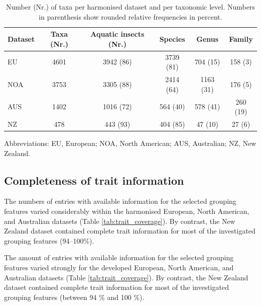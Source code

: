 \documentclass{article}
\begin{document}
\begin{table}[ht]
    \centering
    \caption{Number (Nr.) of taxa per harmonised dataset and per taxonomic level. Numbers in parenthesis show rounded relative frequencies in percent.} 
    \label{tab:tax_coverage}
    \begin{tabular}{lccccc}
    \toprule[.1em]
    Dataset & Taxa (Nr.) & Aquatic insects (Nr.) & Species & Genus & Family \\ 
    \toprule[.1em]
    EU & 4601 & 3942 (86) & 3739 (81) & 704 (15) & 158 (3) \\ 
    NOA & 3753 & 3305 (88) & 2414 (64) & 1163 (31) & 176 (5)  \\ 
    AUS & 1402 & 1016 (72) & 564 (40) & 578 (41) & 260 (19) \\ 
    NZ & 478 & 443 (93) & 404 (85) & 47 (10) & 27 (6) \\ 
    \bottomrule
    \end{tabular}
\end{table}
\begin{minipage}{\linewidth}{\fontsize{8}{10}\selectfont
\centering
Abbreviations: EU, European; NOA, North American; AUS, Australian; NZ, New Zealand.
}
\end{minipage}


\subsection*{Completeness of trait information}

The numbers of entries with available information for the selected grouping features varied considerably within the harmonised European, North American, and Australian datasets (Table \ref{tab:trait_coverage}). By contrast, the New Zealand dataset contained complete trait information for most of the investigated grouping features (94–100\%).

The amount of entries with available information for the selected grouping features varied strongly for the developed European, North American, and Australian datasets (Table \ref{tab:trait_coverage}). By contrast, the New Zealand dataset contained complete trait information for most of the investigated grouping features (between 94 \% and 100 \%).
\end{document}

